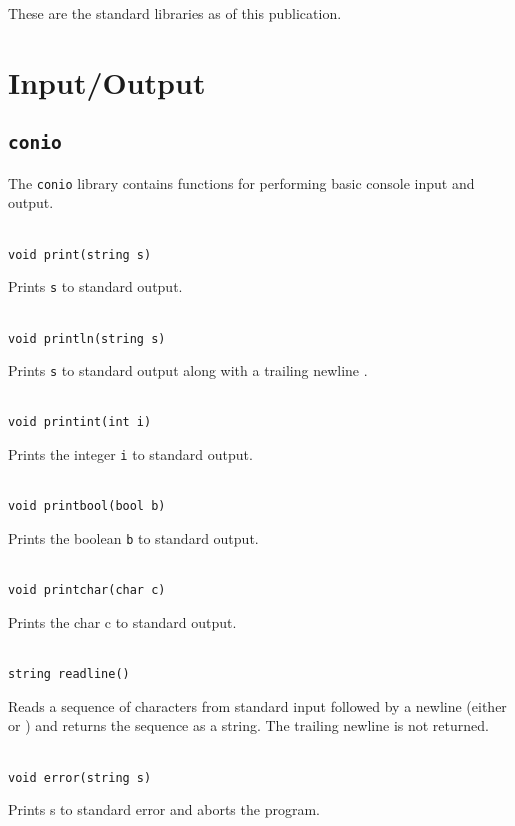 These are the standard libraries as of this publication.

\newcommand{\describefunction}[2]{
\begin{tabbing}
\hspace{3em} \= \\
\> {\tt\small \lstinline|#1| } \\
\end{tabbing}
#2
}

\newcommand{\beginstruct}{
\begin{tabbing}
\hspace{3em} \= \hspace{9em} \= \\
}

\newcommand{\structfield}[2]{
\> {\tt\small \lstinline|#1|} \> #2 \\
}

\newcommand{\structend}{
\end{tabbing}
}

\section{Input/Output}

\subsection{\tt conio}

The {\tt conio} library contains functions for performing basic
console input and output.
\describefunction{void print(string s)}{
Prints {\tt s} to standard output.
}

\describefunction{void println(string s)}{
Prints {\tt s} to standard output along with a trailing newline \langtext{\\n}.
}
\describefunction{void printint(int i)}{
Prints the integer {\tt i} to standard output.
}
\describefunction{void printbool(bool b)}{
Prints the boolean {\tt b} to standard output.
}
\describefunction{void printchar(char c)}{
Prints the char c to standard output.
}
\describefunction{string readline()}{
Reads a sequence of characters from standard input followed by a newline
(either \langtext{\\n} or \langtext{\\r\\n}) and returns the sequence as a
string.  The trailing newline is not returned.
}

\describefunction{void error(string s)}{
Prints s to standard error and aborts the program.
}

